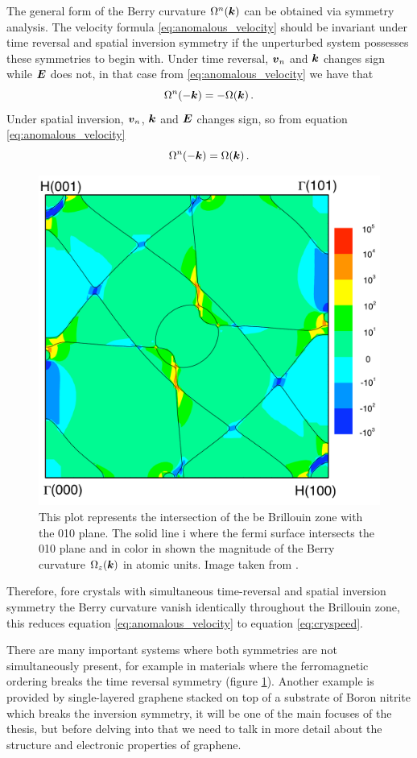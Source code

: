 The general form of the Berry curvature $\Omega^n(\boldsymbol{k})$ can be obtained via symmetry analysis. The velocity formula \ref{eq:anomalous_velocity} should be invariant under time reversal and spatial inversion symmetry if the unperturbed system possesses these symmetries to begin with. Under time reversal, $\boldsymbol{v}_n$ and $\boldsymbol{k}$ changes sign while $\boldsymbol{E}$ does not, in that case from \ref{eq:anomalous_velocity} we have that
\begin{equation}
    \Omega^n(-\boldsymbol{k})=-\Omega(\boldsymbol{k})\,.
\end{equation}
Under spatial inversion, $\boldsymbol{v}_n$, $\boldsymbol{k}$ and $\boldsymbol{E}$ changes sign, so from equation \ref{eq:anomalous_velocity}
\begin{equation}
    \Omega^n(-\boldsymbol{k})=\Omega(\boldsymbol{k})\,.
\end{equation}
\begin{figure}
    \includegraphics[width=.5\textwidth]{Immagini/topo/curvature_Fe.pdf}
    \caption{This plot represents the intersection of the be Brillouin zone with the 010 plane. The solid line i where the fermi surface intersects the 010 plane and in color in shown the magnitude of the Berry curvature $\Omega_z(\boldsymbol{k})$ in atomic units. Image taken from \cite{yao2004first}.}
    \label{fig:berryferro}
\end{figure} 
Therefore, fore crystals with simultaneous time-reversal and spatial inversion symmetry the Berry curvature vanish identically throughout the Brillouin zone, this reduces equation \ref{eq:anomalous_velocity} to equation \ref{eq:cryspeed}.


There are many important systems where both symmetries are not simultaneously present, for example in materials where the ferromagnetic ordering breaks the time reversal symmetry (figure \ref{fig:berryferro}).
Another example is provided by single-layered graphene stacked on top of a substrate of Boron nitrite which breaks the inversion symmetry, it will be one of the main focuses of the thesis, but before delving into that we need to talk in more detail about the structure and electronic properties of graphene.

\newpage